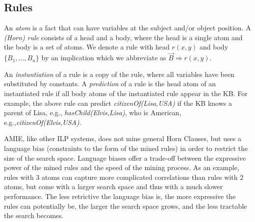 \subsection{Rules}
\label{subsec:rules}
      

An \emph{atom} is a fact that can have variables at the subject and/or object position.
A \emph{(Horn) rule} consists of a head and a body, where the head is a single atom and the body is a set of atoms.
We denote a rule with head $r(x,y)$ and body $\{B_1,..., B_n\}$ by an implication
which we abbreviate as $\vec{B} \Rightarrow r(x,y)$.

An \emph{instantiation} of a rule is a copy of the rule, where all variables have been substituted by constants.
A \emph{prediction} of a rule is the head atom of an instantiated rule if all body atoms of the instantiated rule appear in the KB.
For example, the above rule can predict \emph{citizenOf(Lisa,USA)} if the KB knows a parent of Lisa, e.g.,
\emph{hasChild(Elvis,Lisa)}, who is American, e.g.,\emph{citizenOf(Elvis,USA)}.

AMIE, like other ILP systems, does not mine general Horn Clauses, but uses a language bias (constraints to the form of the mined rules) 
in order to restrict the size of the search space. 
Language biases offer a trade-off between the expressive power of the mined rules and the speed of the mining process.
As an example, rules with 3 atoms can capture more complicated correlations than rules with 2 atoms, but come with a larger search space and thus with a much slower performance.
The less retrictive the language bias is,
the more expressive the rules can potentially be, the larger the search space grows, and the less tractable the search becomes.

